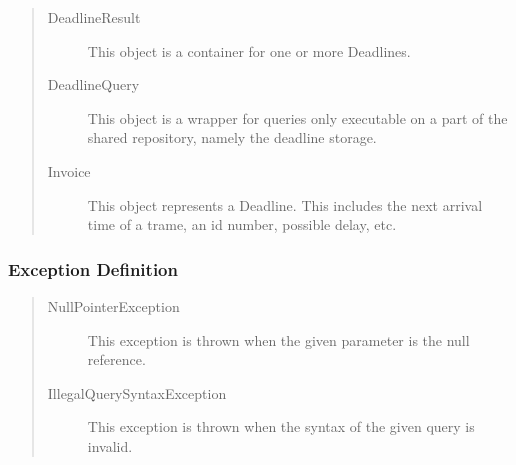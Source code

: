 \begin{quote}
	\begin{description}
		\item[DeadlineResult] This object is a container for one or more Deadlines. 
		\item[DeadlineQuery] This object is a wrapper for queries only executable on a
		part of the shared repository, namely the deadline storage.
		\item[Invoice] This object represents a Deadline. This includes the next
		arrival time of a trame, an id number, possible delay, etc.
	\end{description} 
\end{quote}

\subsubsection{Exception Definition} 

\begin{quote}
	\begin{description}
		\item[NullPointerException] This exception is thrown when the given parameter
		is the null reference.
		\item[IllegalQuerySyntaxException] This exception is thrown when the syntax of
		the given query is invalid.
	\end{description} 
\end{quote}